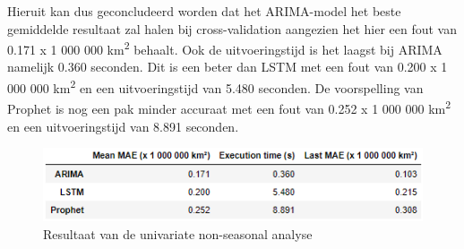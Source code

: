 Hieruit kan dus geconcludeerd worden dat het ARIMA-model het beste gemiddelde resultaat zal halen bij cross-validation aangezien het hier een fout van 0.171 x 1 000 000 km\textsuperscript{2} behaalt. Ook de uitvoeringstijd is het laagst bij ARIMA namelijk 0.360 seconden. Dit is een beter dan LSTM met een fout van 0.200 x 1 000 000 km\textsuperscript{2} en een uitvoeringstijd van 5.480 seconden. De voorspelling van Prophet is nog een pak minder accuraat met een fout van 0.252 x 1 000 000 km\textsuperscript{2} en een uitvoeringstijd van 8.891 seconden.


\begin{figure}[!h]
    \centering
    \caption{Resultaat van de univariate non-seasonal analyse}
    \label{fig:uvnsresult}
    \includegraphics[width=0.9\linewidth]{uv_ns_result}
\end{figure}

